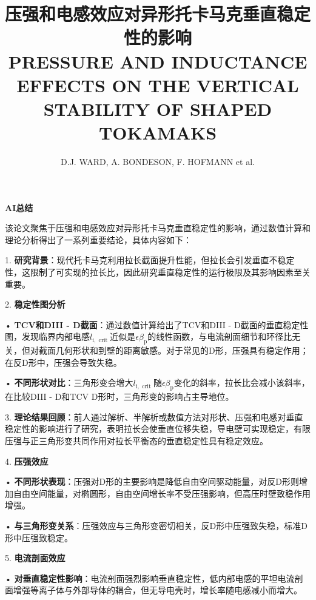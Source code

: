 \documentclass[utf8]{ctexart}
\title{压强和电感效应对异形托卡马克垂直稳定性的影响\\ \Large{PRESSURE AND INDUCTANCE EFFECTS ON THE VERTICAL STABILITY OF SHAPED TOKAMAKS }}  \author{D.J. WARD,  A. BONDESON,  F. HOFMANN et al.}
\date{\paperref}
\newcommand\mainskip{-5pt}
\begin{document}
  \begin{sloppypar}
  \allowdisplaybreaks[3]  
  \setlength{\abovedisplayskip}{-6pt}
  \setlength{\belowdisplayskip}{10pt}
  \setlength{\abovedisplayshortskip}{0pt}
  \setlength{\belowdisplayshortskip}{0pt}
  \setlength{\parskip}{\mainskip}
  
  	\maketitle
 
 {\centering \textbf{AI总结} \par}
 \begin{adjustwidth}{0.1\linewidth}{0.1\linewidth} \small  \setlength{\parskip}{2pt}
 该论文聚焦于压强和电感效应对异形托卡马克垂直稳定性的影响，通过数值计算和理论分析得出了一系列重要结论，具体内容如下：

1. \textbf{研究背景}：现代托卡马克利用拉长截面提升性能，但拉长会引发垂直不稳定性，这限制了可实现的拉长比，因此研究垂直稳定性的运行极限及其影响因素至关重要。

2. \textbf{稳定性图分析}

• \textbf{TCV和DIII - D截面}：通过数值计算给出了TCV和DIII - D截面的垂直稳定性图，发现临界内部电感$l_{\mathrm{i}, \text { crit }}$近似是$\epsilon \beta_{\mathrm{p}}$的线性函数，与电流剖面细节和环径比无关，但对截面几何形状和到壁的距离敏感。对于常见的D形，压强具有稳定作用；在反D形中，压强会导致失稳。

• \textbf{不同形状对比}：三角形变会增大$l_{\mathrm{i}, \text { crit }}$随$\epsilon \beta_{\mathrm{p}}$变化的斜率，拉长比会减小该斜率，在比较DIII - D和TCV D形时，三角形变的影响占主导地位。

3. \textbf{理论结果回顾}：前人通过解析、半解析或数值方法对形状、压强和电感对垂直稳定性的影响进行了研究，表明拉长会使垂直位移失稳，导电壁可实现稳定，有限压强与正三角形变共同作用对拉长平衡态的垂直稳定性具有稳定效应。

4. \textbf{压强效应}

 • \textbf{不同形状表现}：压强对D形的主要影响是降低自由空间驱动能量，对反D形则增加自由空间能量，对椭圆形，自由空间增长率不受压强影响，但高压时壁致稳作用增强。

  • \textbf{与三角形变关系}：压强效应与三角形变密切相关，反D形中压强致失稳，标准D形中压强致稳定。

5. \textbf{电流剖面效应}

 • \textbf{对垂直稳定性影响}：电流剖面强烈影响垂直稳定性，低内部电感的平坦电流剖面增强等离子体与外部导体的耦合，但无导电壳时，增长率随电感减小而增大。


\end{adjustwidth}
\end{sloppypar}
\end{document}
